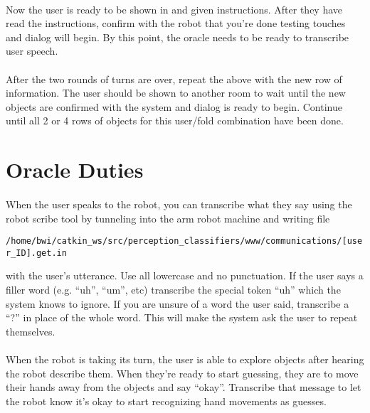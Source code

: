\documentclass{article}
\begin{document}
\paragraph{} Now the user is ready to be shown in and given instructions. After they have read the instructions, confirm with the robot that you're done testing touches and dialog will begin. By this point, the oracle needs to be ready to transcribe user speech.

\paragraph{} After the two rounds of turns are over, repeat the above with the new row of information. The user should be shown to another room to wait until the new objects are confirmed with the system and dialog is ready to begin. Continue until all 2 or 4 rows of objects for this user/fold combination have been done.

\section{Oracle Duties}

\paragraph{} When the user speaks to the robot, you can transcribe what they say using the robot scribe tool by tunneling into the arm robot machine and writing file

\texttt{/home/bwi/catkin\_ws/src/perception\_classifiers/www/communications/[user\_ID].get.in} 

with the user's utterance. Use all lowercase and no punctuation. If the user says a filler word (e.g. ``uh'', ``um'', etc) transcribe the special token ``uh'' which the system knows to ignore. If you are unsure of a word the user said, transcribe a ``?'' in place of the whole word. This will make the system ask the user to repeat themselves.

\paragraph{} When the robot is taking its turn, the user is able to explore objects after hearing the robot describe them. When they're ready to start guessing, they are to move their hands away from the objects and say ``okay''. Transcribe that message to let the robot know it's okay to start recognizing hand movements as guesses.
\end{document}
